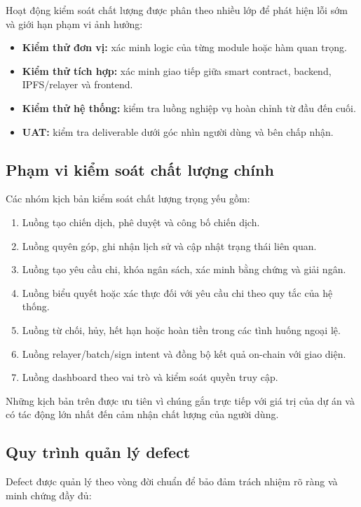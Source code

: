 Hoạt động kiểm soát chất lượng được phân theo nhiều lớp để phát hiện lỗi sớm và giới hạn phạm vi ảnh hưởng:

\begin{itemize}
  \item \textbf{Kiểm thử đơn vị:} xác minh logic của từng module hoặc hàm quan trọng.
  \item \textbf{Kiểm thử tích hợp:} xác minh giao tiếp giữa smart contract, backend, IPFS/relayer và frontend.
  \item \textbf{Kiểm thử hệ thống:} kiểm tra luồng nghiệp vụ hoàn chỉnh từ đầu đến cuối.
  \item \textbf{UAT:} kiểm tra deliverable dưới góc nhìn người dùng và bên chấp nhận.
\end{itemize}

\subsection{Phạm vi kiểm soát chất lượng chính}

Các nhóm kịch bản kiểm soát chất lượng trọng yếu gồm:

\begin{enumerate}
  \item Luồng tạo chiến dịch, phê duyệt và công bố chiến dịch.
  \item Luồng quyên góp, ghi nhận lịch sử và cập nhật trạng thái liên quan.
  \item Luồng tạo yêu cầu chi, khóa ngân sách, xác minh bằng chứng và giải ngân.
  \item Luồng biểu quyết hoặc xác thực đối với yêu cầu chi theo quy tắc của hệ thống.
  \item Luồng từ chối, hủy, hết hạn hoặc hoàn tiền trong các tình huống ngoại lệ.
  \item Luồng relayer/batch/sign intent và đồng bộ kết quả on-chain với giao diện.
  \item Luồng dashboard theo vai trò và kiểm soát quyền truy cập.
\end{enumerate}

Những kịch bản trên được ưu tiên vì chúng gắn trực tiếp với giá trị của dự án và có tác động lớn nhất đến cảm nhận chất lượng của người dùng.

\subsection{Quy trình quản lý defect}

Defect được quản lý theo vòng đời chuẩn để bảo đảm trách nhiệm rõ ràng và minh chứng đầy đủ:

